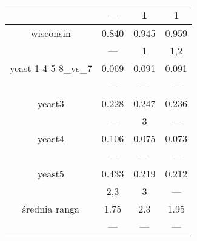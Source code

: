 \documentclass[a4paper,12pt]{article}
\begin{document}
\begin{table}[H]
\begin{center}
\begin{tabular}{|c|c|c|c|}
	& --- & 1 & 1 \\
    \hline
    wisconsin & 0.840 & 0.945 & 0.959 \\
	& --- & 1 & 1,2 \\
    \hline
    yeast-1-4-5-8\_vs\_7 & 0.069 & 0.091 & 0.091 \\
	& --- & --- & --- \\
    \hline
    yeast3 & 0.228 & 0.247 & 0.236 \\
	& --- & 3 & --- \\
    \hline
    yeast4 & 0.106 & 0.075 & 0.073 \\
	& --- & --- & --- \\
    \hline
    yeast5 & 0.433 & 0.219 & 0.212 \\
	& 2,3 & 3 & --- \\
    \hline
    \hline
    średnia ranga & 1.75 & 2.3 & 1.95 \\
    & --- & --- & --- \\
    \hline
    \end{tabular}
    \end{center}
\end{table}
\end{document}
